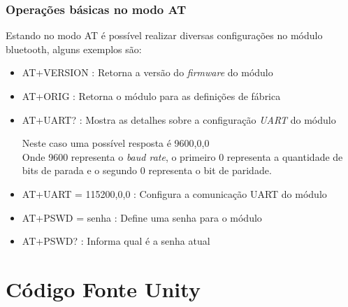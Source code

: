 \begin{table}[H]
   \subsection{Operações básicas no modo AT}
   Estando no modo AT é possível realizar diversas configurações no módulo bluetooth, alguns exemplos são:
   \begin{itemize}
        \item{AT+VERSION : Retorna a versão do \textit{firmware} do módulo} 
        \item{AT+ORIG : Retorna o módulo para as definições de fábrica}
        \item{AT+UART? : Mostra as detalhes sobre a configuração \textit{UART} do módulo}

        Neste caso uma possível resposta é 9600,0,0 
        \\
        Onde 9600 representa o \textit{baud rate}, o primeiro 0 representa a quantidade de bits de parada e o segundo 0 representa o bit de paridade.
        \item{AT+UART = 115200,0,0 : Configura a comunicação UART do módulo}
        \item{AT+PSWD = senha : Define uma senha para o módulo}
        \item{AT+PSWD? : Informa qual é a senha atual}
   \end{itemize}
\end{table} 

\newpage

	\chapter{Código Fonte Unity} \label{apendiceD}

